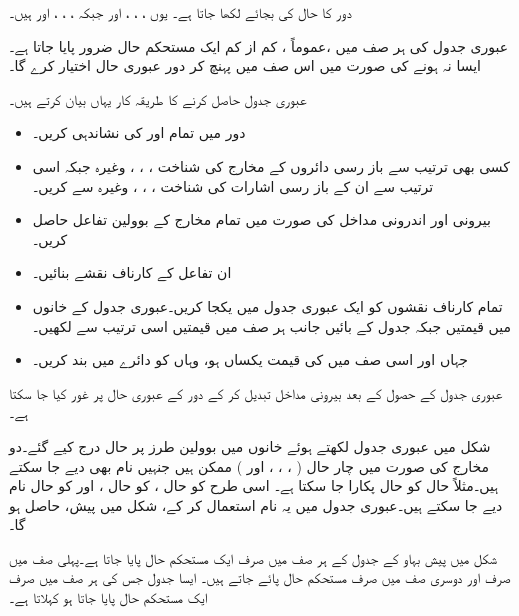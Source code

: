  دور کا حال  کی بجائے  لکھا جاتا ہے۔ یوں ، ، ، اور  جبکہ ، ، ، اور  ہیں۔
 
عبوری جدول کی ہر صف میں ،عموماً ، کم از کم ایک مستحکم حال ضرور پایا جاتا ہے۔ایسا نہ ہونے کی صورت میں اس صف میں پہنچ کر دور عبوری حال اختیار کرے گا۔

عبوری جدول حاصل کرنے کا طریقہ کار یہاں بیان کرتے ہیں۔
\begin{itemize}
\item
دور میں تمام اور  کی نشاندہی کریں۔
\item
 کسی بھی ترتیب سے باز رسی دائروں کے مخارج کی شناخت ، ، ، وغیرہ جبکہ اسی ترتیب سے ان کے باز رسی اشارات کی شناخت ، ، ، وغیرہ سے کریں۔
\item
 بیرونی اور اندرونی مداخل کی صورت میں تمام مخارج کے بوولین تفاعل حاصل کریں۔
\item 
 ان تفاعل کے کارناف نقشے بنائیں۔
\item 
 تمام کارناف نقشوں کو ایک عبوری جدول میں یکجا کریں۔عبوری جدول کے خانوں میں  قیمتیں جبکہ جدول کے بائیں جانب ہر صف میں  قیمتیں اسی ترتیب سے لکھیں۔
\item 
 جہاں  اور اسی صف میں  کی قیمت یکساں ہو، وہاں  کو دائرے میں بند کریں۔
 \end{itemize}
عبوری جدول کے حصول کے بعد بیرونی مداخل تبدیل کر کے دور کے عبوری حال پر غور کیا جا سکتا ہے۔ 

شکل میں عبوری جدول لکھتے ہوئے خانوں میں بوولین طرز پر حال درج کیے گئے۔دو مخارج کی صورت میں چار حال ( ، ، ، اور  ) ممکن ہیں جنہیں نام بھی دیے جا سکتے ہیں۔مثلاً حال  کو حال  پکارا جا سکتا ہے۔ اسی طرح  کو حال ،  کو حال ، اور  کو حال  نام دیے جا سکتے ہیں۔عبوری جدول میں یہ نام استعمال کر کے، شکل  میں پیش،  حاصل ہو گا۔

شکل  میں پیش بہاو کے جدول کے ہر صف میں صرف ایک مستحکم حال پایا جاتا ہے۔پہلی صف میں صرف  اور دوسری صف میں صرف  مستحکم حال پائے جاتے ہیں۔ ایسا جدول جس کی ہر صف میں صرف ایک مستحکم حال پایا جاتا ہو  کہلاتا ہے۔


